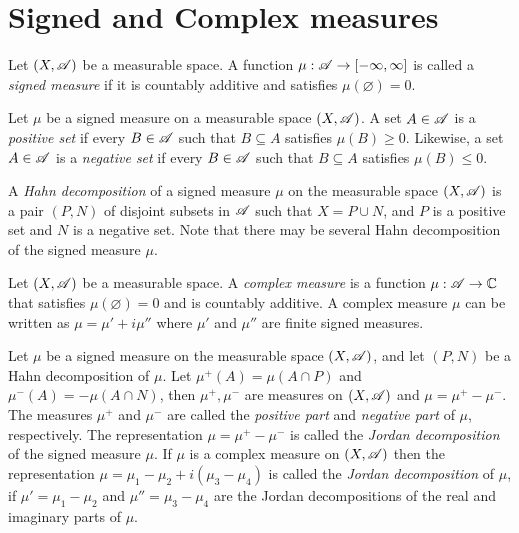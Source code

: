 \documentclass[12pt]{article}
\begin{document}
\section{Signed and Complex measures}
\begin{definition}
    Let $(X,\mathscr{A})$ be a measurable space. A function $\mu:\mathscr{A}\to[-\infty,\infty]$ is called a \textit{signed measure} if it is countably additive and satisfies $\mu(\varnothing)=0$. 
\end{definition}
\begin{definition}
    Let $\mu$ be a signed measure on a measurable space $(X,\mathscr{A})$. A set $A\in \mathscr{A}$ is a \textit{positive set} if every $B\in\mathscr{A}$ such that $B\subseteq A$ satisfies $\mu(B)\geq 0$. Likewise, a set $A\in\mathscr{A}$ is a \textit{negative set} if every $B\in \mathscr{A}$ such that $B\subseteq A$ satisfies $\mu(B)\leq 0$.
\end{definition}
\begin{definition}
    A \textit{Hahn decomposition} of a signed measure $\mu$ on the measurable space $(X,\mathscr{A})$ is a pair $(P,N)$ of disjoint subsets in $\mathscr{A}$ such that $X=P\cup N$, and $P$ is a positive set and $N$ is a negative set. Note that there may be several Hahn decomposition of the signed measure $\mu$.
\end{definition}
\begin{definition}
    Let $(X,\mathscr{A})$ be a measurable space. A \textit{complex measure} is a function $\mu:\mathscr{A}\to\mathbb{C}$ that satisfies $\mu(\varnothing)=0$ and is countably additive. A complex measure $\mu$ can be written as $\mu=\mu'+i\mu''$ where $\mu'$ and $\mu''$ are finite signed measures. 
\end{definition}
\begin{definition}
    Let $\mu$ be a signed measure on the measurable space $(X,\mathscr{A})$, and let $(P,N)$ be a Hahn decomposition of $\mu$. Let $\mu^+(A)=\mu(A\cap P)$ and $\mu^-(A)=-\mu(A\cap N)$, then $\mu^+,\mu^-$ are measures on $(X,\mathscr{A})$ and $\mu=\mu^+-\mu^-$. The measures $\mu^+$ and $\mu^-$ are called the \textit{positive part} and \textit{negative part} of $\mu$, respectively. The representation $\mu=\mu^+-\mu^-$ is called the \textit{Jordan decomposition} of the signed measure $\mu$. If $\mu$ is a complex measure on $(X,\mathscr{A})$ then the representation $\mu=\mu_1-\mu_2 +i(\mu_3-\mu_4)$ is called the \textit{Jordan decomposition} of $\mu$, if $\mu'=\mu_1-\mu_2$ and $\mu''=\mu_3-\mu_4$ are the Jordan decompositions of the real and imaginary parts of $\mu$.
\end{definition}
\end{document}
